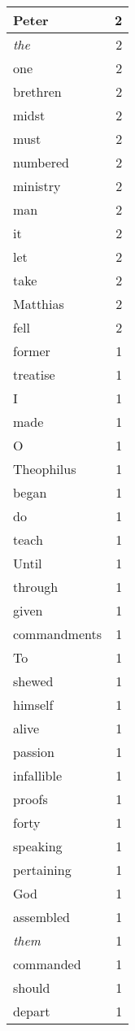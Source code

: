 \begin{center}
\begin{longtable}{l|r}
Peter & 2 \\ \hline
\emph{the} & 2 \\ \hline
one & 2 \\ \hline
brethren & 2 \\ \hline
midst & 2 \\ \hline
must & 2 \\ \hline
numbered & 2 \\ \hline
ministry & 2 \\ \hline
man & 2 \\ \hline
it & 2 \\ \hline
let & 2 \\ \hline
take & 2 \\ \hline
Matthias & 2 \\ \hline
fell & 2 \\ \hline
former & 1 \\ \hline
treatise & 1 \\ \hline
I & 1 \\ \hline
made & 1 \\ \hline
O & 1 \\ \hline
Theophilus & 1 \\ \hline
began & 1 \\ \hline
do & 1 \\ \hline
teach & 1 \\ \hline
Until & 1 \\ \hline
through & 1 \\ \hline
given & 1 \\ \hline
commandments & 1 \\ \hline
To & 1 \\ \hline
shewed & 1 \\ \hline
himself & 1 \\ \hline
alive & 1 \\ \hline
passion & 1 \\ \hline
infallible & 1 \\ \hline
proofs & 1 \\ \hline
forty & 1 \\ \hline
speaking & 1 \\ \hline
pertaining & 1 \\ \hline
God & 1 \\ \hline
assembled & 1 \\ \hline
\emph{them} & 1 \\ \hline
commanded & 1 \\ \hline
should & 1 \\ \hline
depart & 1 \\ \hline

\end{longtable}
\end{center}

